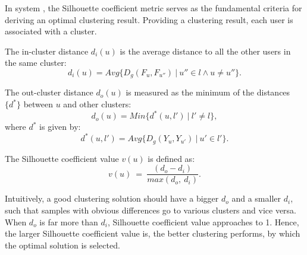 In system \sys{}, the Silhouette coefficient metric serves as the fundamental criteria for deriving an optimal clustering result.
Providing a clustering result, each user is associated with a cluster.


\begin{definition}
\label{def:di}
The in-cluster distance $d_i(u)$ is the average distance to all the other users in the same cluster:
\begin{equation}
	d_i(u) = Avg\{D_g(F_u, F_{u''})\ |\ u'' \in l \wedge  u \neq u''\}.
\end{equation}
\end{definition}

\begin{definition}
\label{def:do}
The out-cluster distance $d_o(u)$ is measured as the minimum of the distances $\{d^{\ast}\}$ between $u$ and other clusters:
\begin{equation}
	d_o(u) = Min\{d^{\ast}(u, l')\ |\  l' \neq l \},
\end{equation}
where $d^{\ast}$ is given by:
\begin{equation}
	d^{\ast}(u, l') = Avg\{D_g(Y_u, Y_{u'}) \ | \ u' \in l'\}.
\end{equation}
\end{definition}

\begin{definition}
\label{def:coef}
The Silhouette coefficient value $v(u)$ is defined as:
\begin{equation}
\label{eq:coef}
v(u)\ =\ \frac{(d_o - d_i)}{max(d_o,\ d_i)}.	
\end{equation}
\end{definition}

Intuitively, a good clustering solution should have a bigger $d_o$ and a smaller $d_i$, such that samples with obvious differences go to various clusters and vice versa.
When $d_o$ is far more than $d_i$, Silhouette coefficient value approaches to 1.
Hence, the larger Silhouette coefficient value is, the better clustering performs, by which the optimal solution is selected.





